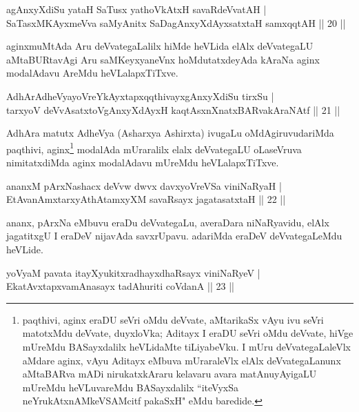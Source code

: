 \begin{shl}
agAnxyXdiSu yataH SaTusx yathoVkAtxH savaRdeVvatAH |\\
SaTasxMKAyxmeVva saMyAnitx SaDagAnxyXdAyxsatxtaH samxqqtAH \hfill || 20 ||
\end{shl}

\begin{artha}
aginxmuMtAda Aru deVvategaLalilx hiMde heVLida elAlx deVvategaLU aMtaBURtavAgi Aru saMKeyxyaneVnx hoMdutatxdeyAda kAraNa aginx modalAdavu AreMdu heVLalapxTiTxve.
\end{artha}


\begin{shl}
AdhArAdheVyayoVreYkAyxtapxqqthivayxgAnxyXdiSu tirxSu |\\
tarxyoV deVvAsatxtoV\s gAnxyXdAyxH kaqtAsxnXnatxBARvakAraNAtf \hfill || 21 ||
\end{shl}

\begin{artha}
AdhAra matutx AdheVya (Asharxya Ashirxta) ivugaLu oMdAgiruvudariMda paqthivi, aginx\footnote[1]{paqthivi, aginx eraDU seVri oMdu deVvate, aMtarikaSx vAyu ivu seVri matotxMdu deVvate, duyxloVka; Aditayx I eraDU seVri oMdu deVvate, hiVge mUreMdu BASayxdalilx heVLidaMte tiLiyabeVku. I mUru deVvategaLaleVlx aMdare aginx, vAyu Aditayx eMbuva mUraraleVlx elAlx deVvategaLanunx aMtaBARva mADi nirukatxkAraru kelavaru avara matAnuyAyigaLU mUreMdu heVLuvareMdu BASayxdalilx ``iteVyxSa neYrukAtxnAMkeVSAMcitf pakaSxH" eMdu baredide.} modalAda mUraralilx elalx deVvategaLU oLaseVruva nimitatxdiMda aginx modalAdavu mUreMdu heVLalapxTiTxve.
\end{artha}


\begin{shl}
ananxM pArxNashacx deVvw dwvx davxyoVreVSa viniNaRyaH |\\
EtAvanAmxtarxyAthAtamxyXM savaRsayx jagatasatxtaH \hfill || 22 ||
\end{shl}

\begin{artha}
ananx, pArxNa eMbuvu eraDu deVvategaLu, averaDara niNaRyavidu, elAlx jagatitxgU I eraDeV nijavAda savxrUpavu. adariMda eraDeV deVvategaLeMdu heVLide.
\end{artha}

\begin{shl}
yoV\s yaM pavata itayXyukitxradhayxdhaRsayx viniNaRyeV |\\
EkatAvxtapxvamAnasayx tadAhuriti coVdanA \hfill || 23 ||
\end{shl}

